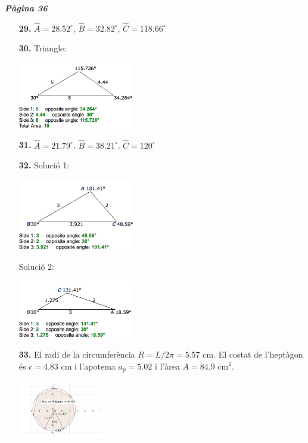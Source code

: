 \documentclass[a4paper, pdf, twoside]{book}
\begin{document}
\begin{multicols}{2}
{\textbf{\em Pàgina 36}} \hrulefill
\begin{enumerate}
\vspace{0.25cm}
\item[\fontfamily{phv}\selectfont\color{blue}\textbf{29. }] 
$\hat A=28.52^\circ $, $\hat B=32.82^\circ $, $\hat C=118.66^\circ $
 \end{enumerate}
\begin{enumerate}
\vspace{0.25cm}
\item[\fontfamily{phv}\selectfont\color{blue}\textbf{30. }] 
Triangle:\par \includegraphics [width=0.4\textwidth ]{img-sol/t3-30}
\vspace{0.25cm}
\item[\fontfamily{phv}\selectfont\color{blue}\textbf{31. }] 
$\hat A=21.79^\circ $, $\hat B=38.21^\circ $, $\hat C=120^\circ $
\vspace{0.25cm}
\item[\fontfamily{phv}\selectfont\color{blue}\textbf{32. }] 
Solució 1:\par \includegraphics [width=0.4\textwidth ]{img-sol/t3-32a} \par Solució 2:\par \includegraphics [width=0.4\textwidth ]{img-sol/t3-32b} 
\vspace{0.25cm}
\item[\fontfamily{phv}\selectfont\color{blue}\textbf{33. }] 
El radi de la circumferència $R=L/2\pi =5.57$ cm. El costat de l'heptàgon és $c=4.83$ cm i l'apotema $a_p=5.02$ i l'àrea $A=84.9$ cm$^2$.\par \includegraphics [width=0.3\textwidth ]{img-sol/t3-33}

\end{enumerate}
\end{multicols}
\end{document}
